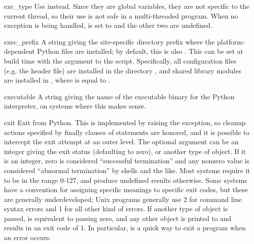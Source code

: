 \begin{datadesc}{exc_type}
            {Use  instead.}
Since they are global variables, they are not specific to the current
thread, so their use is not safe in a multi-threaded program.  When no
exception is being handled,  is set to  and
the other two are undefined.
\end{datadesc}

\begin{datadesc}{exec_prefix}
A string giving the site-specific directory prefix where the
platform-dependent Python files are installed; by default, this is
also .  This can be set at build time with the
 argument to the
 script.  Specifically, all configuration files
(e.g. the  header file) are installed in the directory
, and shared
library modules are installed in , where  is equal
to .
\end{datadesc}

\begin{datadesc}{executable}
A string giving the name of the executable binary for the Python
interpreter, on systems where this makes sense.
\end{datadesc}

\begin{funcdesc}{exit}{}
Exit from Python.  This is implemented by raising the
 exception, so cleanup actions specified by
finally clauses of  statements are honored, and it is
possible to intercept the exit attempt at an outer level.  The
optional argument  can be an integer giving the exit status
(defaulting to zero), or another type of object.  If it is an integer,
zero is considered ``successful termination'' and any nonzero value is
considered ``abnormal termination'' by shells and the like.  Most
systems require it to be in the range 0-127, and produce undefined
results otherwise.  Some systems have a convention for assigning
specific meanings to specific exit codes, but these are generally
underdeveloped; Unix programs generally use 2 for command line syntax
errors and 1 for all other kind of errors.  If another type of object
is passed,  is equivalent to passing zero, and any other
object is printed to  and results in an exit code of
1.  In particular,  is a quick
way to exit a program when an error occurs.
\end{funcdesc}

